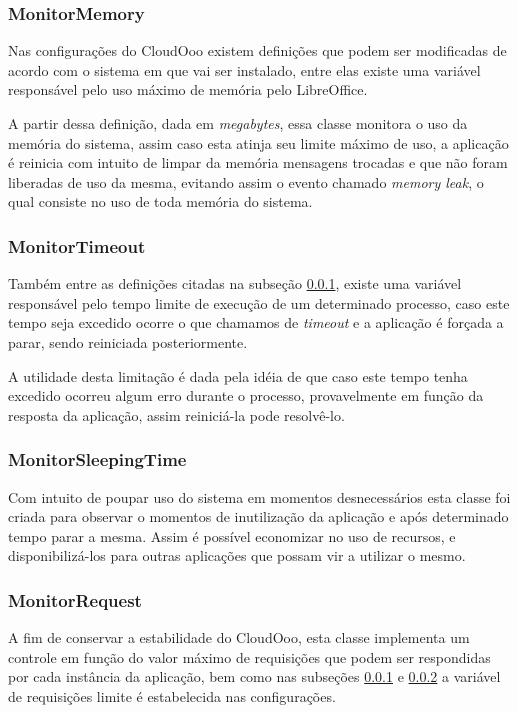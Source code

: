 \subsubsection{MonitorMemory}
\label{monitormem}

Nas configurações do CloudOoo existem definições que podem ser modificadas de acordo com o sistema em que vai ser instalado, entre elas existe uma variável responsável pelo uso máximo de memória pelo LibreOffice.

A partir dessa definição, dada em \textit{megabytes}, essa classe monitora o uso da memória do sistema, assim caso esta atinja seu limite máximo de uso, a aplicação é reinicia com intuito de limpar da memória mensagens trocadas e que não foram liberadas de uso da mesma, evitando assim o evento chamado \textit{memory leak}, o qual consiste no uso de toda memória do sistema.


\subsubsection{MonitorTimeout}
\label{monitortim}

Também entre as definições citadas na subseção \ref{monitormem}, existe uma variável responsável pelo tempo limite de execução de um determinado processo, caso este tempo seja excedido ocorre o que chamamos de \textit{timeout} e a aplicação é forçada a parar, sendo reiniciada posteriormente.

A utilidade desta limitação é dada pela idéia de que caso este tempo tenha excedido ocorreu algum erro durante o processo, provavelmente em função da resposta da aplicação, assim reiniciá-la pode resolvê-lo.


\subsubsection{MonitorSleepingTime}

Com intuito de poupar uso do sistema em momentos desnecessários esta classe foi criada para observar o momentos de inutilização da aplicação e após determinado tempo parar a mesma. Assim é possível economizar no uso de recursos, e disponibilizá-los para outras aplicações que possam vir a utilizar o mesmo.


\subsubsection{MonitorRequest}

A fim de conservar a estabilidade do CloudOoo, esta classe implementa um controle em função do valor máximo de requisições que podem ser respondidas por cada instância da aplicação, bem como nas subseções \ref{monitormem} e \ref{monitortim} a variável de requisições limite é estabelecida nas configurações.

